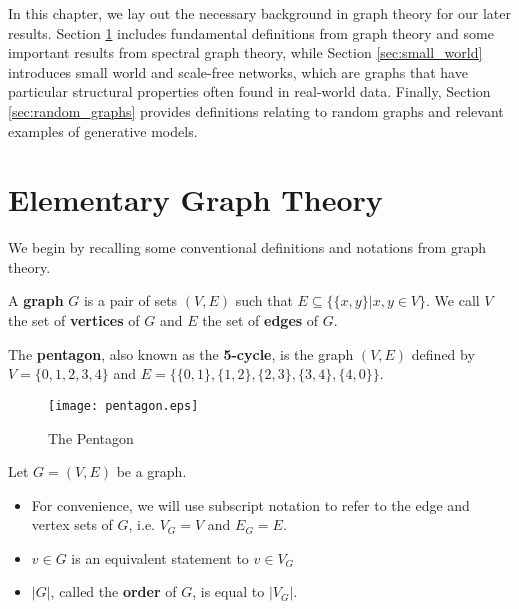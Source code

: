 In this chapter, we lay out the necessary background in graph theory for our later results. Section
\ref{sec:intro_graphs} includes fundamental definitions from graph theory and some important results
from spectral graph theory, while Section \ref{sec:small_world} introduces small world and scale-free
networks, which are graphs that have particular structural properties often found in real-world data.
Finally, Section \ref{sec:random_graphs} provides definitions relating to random graphs and relevant examples
of generative models.

\section{Elementary Graph Theory}
\label{sec:intro_graphs}




We begin by recalling some conventional definitions and notations from graph
theory.

\begin{definition}
  A \textbf{graph} $G$ is a pair of sets $(V,E)$ such that
  $E \subseteq \{ \{x,y\} | x,y \in V \}$. We call $V$ the set of
  \textbf{vertices} of $G$ and $E$ the set of \textbf{edges} of $G$.
\end{definition}


\begin{example}
  The \textbf{pentagon}, also known as the \textbf{5-cycle}, is the graph $(V,E)$ defined by
  $V = \{0,1,2,3,4\}$ and $E = \{\{0,1\}, \{1,2\}, \{2,3\},\allowbreak \{3,4\}, \{4,0\}\}$.
\end{example}

\begin{figure}[H]
  \centering
  \texttt{[image: pentagon.eps]}
  \caption{The Pentagon}
  \label{fig:pentagon}
\end{figure}

\begin{remark}[Notation]
  Let $G = (V,E)$ be a graph.

  \begin{itemize}
  \item For convenience, we will use subscript notation to refer to the edge and vertex sets of $G$,
    i.e. $V_G = V$ and $E_G = E$.
  \item $v \in G$ is an equivalent statement to $v \in V_G$
  \item $|G|$, called the \textbf{order} of $G$, is equal to $|V_G|$.
  \end{itemize}
\end{remark}

